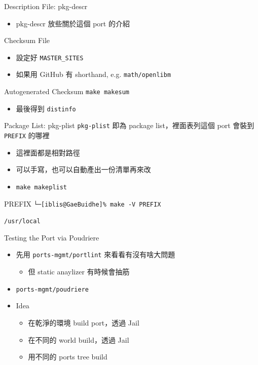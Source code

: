 \documentclass[aspectratio=169]{beamer}
\begin{document}
\begin{frame}[t,fragile]{Description File: pkg-descr}
  \begin{itemize}
    \item pkg-descr 放些關於這個 port 的介紹
  \end{itemize}
\end{frame}

\begin{frame}[t,fragile]{Checksum File}
  \begin{itemize}
    \item 設定好 \verb`MASTER_SITES`
    \item 如果用 GitHub 有 shorthand, e.g. \verb`math/openlibm`
  \end{itemize}
  \begin{block}{Autogenerated Checksum}
    \verb`make makesum`
  \end{block}
  \begin{itemize}
    \item 最後得到 \verb`distinfo`
  \end{itemize}
\end{frame}

\begin{frame}[t,fragile]{Package List: pkg-plist}
  \verb`pkg-plist` 即為 package list，裡面表列這個 port 會裝到 \verb`PREFIX` 的哪裡
  \begin{itemize}
      \item 這裡面都是相對路徑
      \item 可以手寫，也可以自動產出一份清單再來改
      \item \verb`make makeplist`
  \end{itemize}

  \begin{block}{PREFIX}
    \verb`└─[iblis@GaeBuidhe]% make -V PREFIX`

    \verb`/usr/local`
  \end{block}

\end{frame}

\begin{frame}[t,fragile]{Testing the Port via Poudriere}
  \begin{itemize}
    \item 先用 \verb`ports-mgmt/portlint` 來看看有沒有啥大問題
      \begin{itemize}
        \item 但 static anaylizer 有時候會抽筋
      \end{itemize}
    \item \verb`ports-mgmt/poudriere`
    \item Idea
      \begin{itemize}
        \item 在乾淨的環境 build port，透過 Jail
        \item 在不同的 world build，透過 Jail
        \item 用不同的 ports tree build
      \end{itemize}
  \end{itemize}
\end{frame}
\end{document}
